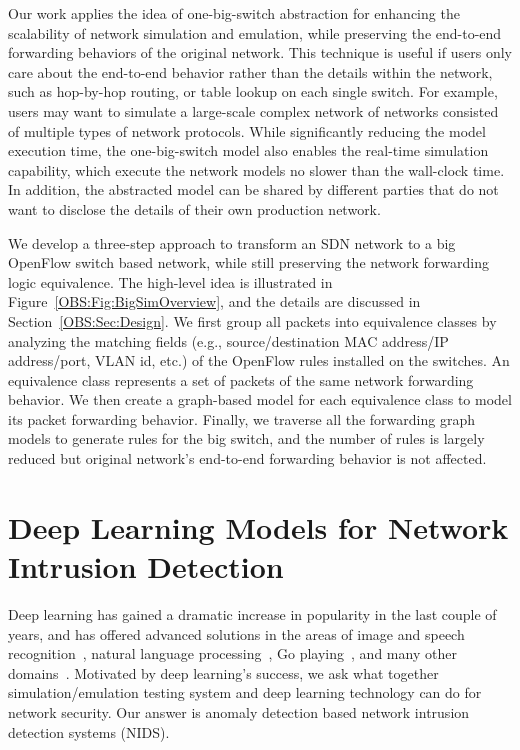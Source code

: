 Our work applies the idea of one-big-switch abstraction for enhancing the scalability
of network simulation and emulation, while preserving the end-to-end forwarding behaviors of the original network.
This technique is useful if users only care about the end-to-end behavior rather than
the details within the network, such as hop-by-hop routing, or table lookup on each single switch.
For example, users may want to simulate a large-scale complex network of networks consisted of multiple types of network protocols.
While significantly reducing the model execution time, the one-big-switch model also enables the real-time simulation capability,
which execute the network models no slower than the wall-clock time.
In addition, the abstracted model can be shared by different parties that do not want to disclose the details
of their own production network.

We develop a three-step approach to transform an SDN network to a big OpenFlow switch based network,
while still preserving the network forwarding logic equivalence.
The high-level idea is illustrated in Figure~\ref{OBS:Fig:BigSimOverview},
and the details are discussed in Section~\ref{OBS:Sec:Design}.
We first group all packets into equivalence classes by analyzing the matching fields
(e.g., source/destination MAC address/IP address/port, VLAN id, etc.)
of the OpenFlow rules installed on the switches.
An equivalence class represents a set of packets of the same network forwarding behavior.
We then create a graph-based model for each equivalence class to model its packet forwarding behavior.
Finally, we traverse all the forwarding graph models to generate rules for the big switch,
and the number of rules is largely reduced but original network's end-to-end forwarding behavior is not affected.

\section{Deep Learning Models for Network Intrusion Detection}
Deep learning has gained a dramatic increase in popularity in the last couple of years,
and has offered advanced solutions in the areas of image and speech recognition~\cite{AlexNet, SpeechDNN},
natural language processing~\cite{Word2Vec}, Go playing~\cite{AlphaGo}, and many other domains~\cite{DeepLearning}. 
Motivated by deep learning's success, we ask what together simulation/emulation testing system and deep learning technology can do for network security.
Our answer is anomaly detection based network intrusion detection systems (NIDS).

